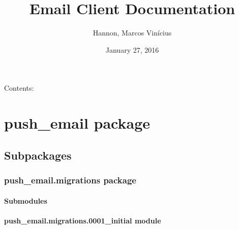 \documentclass[letterpaper,10pt,english]{sphinxmanual}
\title{Email Client Documentation}
\date{January 27, 2016}
\author{Hannon, Marcos Vinícius}
\begin{document}
\maketitle
\tableofcontents
{}\label{index::doc}


Contents:


\chapter{push\_email package}
\label{push_email:push-email-package}\label{push_email:welcome-to-email-client-s-documentation}\label{push_email::doc}

\section{Subpackages}
\label{push_email:subpackages}

\subsection{push\_email.migrations package}
\label{push_email.migrations:push-email-migrations-package}\label{push_email.migrations::doc}

\subsubsection{Submodules}
\label{push_email.migrations:submodules}

\subsubsection{push\_email.migrations.0001\_initial module}
\label{push_email.migrations:module-push_email.migrations.0001_initial}\label{push_email.migrations:push-email-migrations-0001-initial-module}
\end{document}
